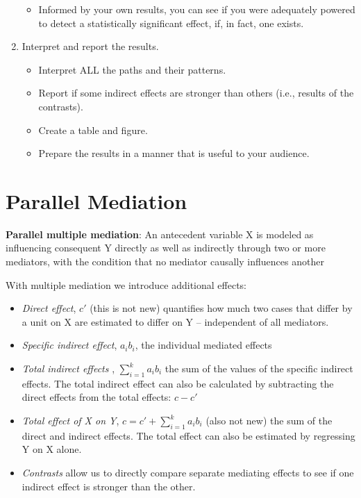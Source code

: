 \documentclass[
  11pt,
]{book}
\providecommand{\tightlist}{%
  \setlength{\itemsep}{0pt}\setlength{\parskip}{0pt}}
\begin{document}
\begin{enumerate}
  \begin{itemize}
  \tightlist
  \item
    Informed by your own results, you can see if you were adequately powered to detect a statistically significant effect, if, in fact, one exists.
  \end{itemize}
\item
  Interpret and report the results.

  \begin{itemize}
  \tightlist
  \item
    Interpret ALL the paths and their patterns.
  \item
    Report if some indirect effects are stronger than others (i.e., results of the contrasts).
  \item
    Create a table and figure.
  \item
    Prepare the results in a manner that is useful to your audience.
  \end{itemize}
\end{enumerate}

\hypertarget{parallel-mediation}{%
\section{Parallel Mediation}\label{parallel-mediation}}

\textbf{Parallel multiple mediation}: An antecedent variable X is modeled as influencing consequent Y directly as well as indirectly through two or more mediators, with the condition that no mediator causally influences another \citep[p.~161]{hayes_more_2022}

With multiple mediation we introduce additional effects:

\begin{itemize}
\tightlist
\item
  \emph{Direct effect}, \(c'\) (this is not new) quantifies how much two cases that differ by a unit on X are estimated to differ on Y -- independent of all mediators.
\item
  \emph{Specific indirect effect}, \(a_{i}b_{i}\), the individual mediated effects
\item
  \emph{Total indirect effects }, \(\sum_{i=1}^{k}a_{i}b_{i}\) the sum of the values of the specific indirect effects. The total indirect effect can also be calculated by subtracting the direct effects from the total effects: \(c - c'\)
\item
  \emph{Total effect of X on Y}, \(c = c' + \sum_{i=1}^{k}a_{i}b_{i}\) (also not new) the sum of the direct and indirect effects. The total effect can also be estimated by regressing Y on X alone.
\item
  \emph{Contrasts} allow us to directly compare separate mediating effects to see if one indirect effect is stronger than the other.
\end{itemize}
\end{document}
